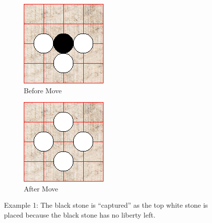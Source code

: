 \documentclass{l4proj}
\begin{document}
\begin{figure}[!h]
\centering
\begin{subfigure}[b]{0.45\textwidth}
\includegraphics[width=\textwidth]{ex/Ex1-0.png}
\caption{Before Move}
\label{fig:ex1-0}
\end{subfigure}
\begin{subfigure}[b]{0.45\textwidth}
\includegraphics[width=\textwidth]{ex/Ex1-1.png}
\caption{After Move}
\label{fig:ex1-1}
\end{subfigure}
\caption{Example 1: The black stone is “captured” as the top white stone is placed because the black stone has no liberty left.}
\label{fig:ex1}
\end{figure}
\end{document}
